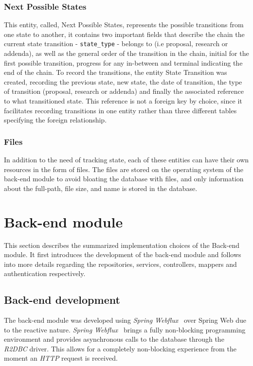 \subsubsection{Next Possible States}\label{subsubsec:next-possible-states-entity}
This entity, called, Next Possible States, represents the possible transitions from one state to another, it contains two important fields that describe the chain the current state transition - \texttt{state\_type} - belongs to (i.e proposal, research or addenda), as well as the general order of the transition in the chain, initial for the first possible transition, progress for any in-between and terminal indicating the end of the chain.
To record the transitions, the entity State Transition was created, recording the previous state, new state, the date of transition, the type of transition (proposal, research or addenda) and finally the associated reference to what transitioned state. This reference is not a foreign key by choice, since it facilitates recording transitions in one entity rather than three different tables specifying the foreign relationship.


\subsubsection{Files}\label{subsubsec:files-model}
In addition to the need of tracking state, each of these entities can have their own resources in the form of files.
The files are stored on the operating system of the back-end module to avoid bloating the database with files, and only information about the full-path, file size, and name is stored in the database.


\section{Back-end module}\label{sec:back-end-module}
This section describes the summarized implementation choices of the Back-end module.
It first introduces the development of the back-end module and follows into more details regarding the repositories, services, controllers, mappers and authentication respectively.


\subsection{Back-end development}

The back-end module was developed using \textit{Spring Webflux}~\cite{spring-webflux} over Spring Web due to the reactive nature. \textit{Spring Webflux}~\cite{spring-webflux} brings a fully non-blocking programming environment and provides asynchronous calls to the database through the \textit{R2DBC} driver. This allows for a completely non-blocking experience from the moment an \textit{HTTP} request is received. 

